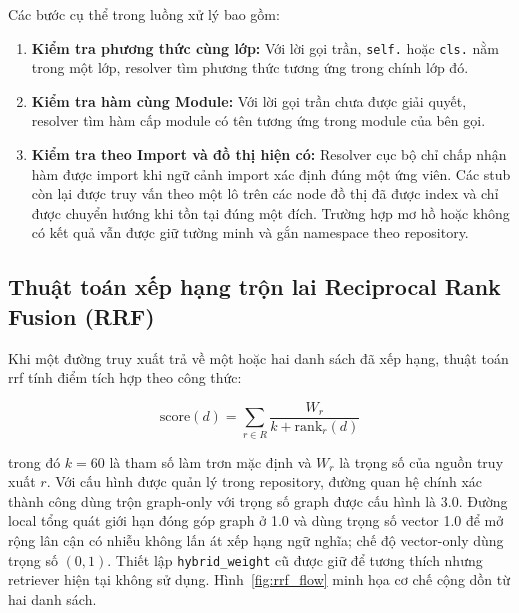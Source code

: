 \documentclass[12pt,a4paper,oneside]{report}
\begin{document}
Các bước cụ thể trong luồng xử lý bao gồm:
\begin{enumerate}
    \item \textbf{Kiểm tra phương thức cùng lớp:} Với lời gọi trần, \texttt{self.} hoặc \texttt{cls.} nằm trong một lớp, resolver tìm phương thức tương ứng trong chính lớp đó.
    \item \textbf{Kiểm tra hàm cùng Module:} Với lời gọi trần chưa được giải quyết, resolver tìm hàm cấp module có tên tương ứng trong module của bên gọi.
    \item \textbf{Kiểm tra theo Import và đồ thị hiện có:} Resolver cục bộ chỉ chấp nhận hàm được import khi ngữ cảnh import xác định đúng một ứng viên. Các stub còn lại được truy vấn theo một lô trên các node đồ thị đã được index và chỉ được chuyển hướng khi tồn tại đúng một đích. Trường hợp mơ hồ hoặc không có kết quả vẫn được giữ tường minh và gắn namespace theo repository.
\end{enumerate}

\subsection{Thuật toán xếp hạng trộn lai Reciprocal Rank Fusion (RRF)}
Khi một đường truy xuất trả về một hoặc hai danh sách đã xếp hạng, thuật toán \gls{rrf} \cite{cormack2009rrf} tính điểm tích hợp theo công thức:

\begin{equation}
    \text{score}(d) = \sum_{r \in R} \frac{W_r}{k + \text{rank}_r(d)}
    \label{eq:rrf}
\end{equation}

trong đó $k = 60$ là tham số làm trơn mặc định và $W_r$ là trọng số của nguồn truy xuất $r$. Với cấu hình được quản lý trong repository, đường quan hệ chính xác thành công dùng trộn graph-only với trọng số graph được cấu hình là 3.0. Đường local tổng quát giới hạn đóng góp graph ở 1.0 và dùng trọng số vector 1.0 để mở rộng lân cận có nhiễu không lấn át xếp hạng ngữ nghĩa; chế độ vector-only dùng trọng số $(0,1)$. Thiết lập \texttt{hybrid\_weight} cũ được giữ để tương thích nhưng retriever hiện tại không sử dụng. Hình~\ref{fig:rrf_flow} minh họa cơ chế cộng dồn từ hai danh sách.
\end{document}
